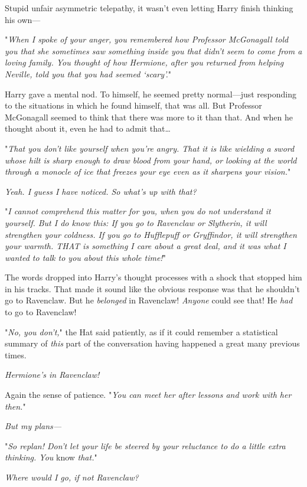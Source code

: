 Stupid unfair asymmetric telepathy, it wasn't even letting Harry finish
thinking his own---

"\emph{When I spoke of your anger, you remembered how Professor McGonagall told
you that she sometimes saw something inside you that didn't seem to come from a
loving family. You thought of how Hermione, after you returned from helping
Neville, told you that you had seemed `scary'.}"

Harry gave a mental nod. To himself, he seemed pretty normal---just responding
to the situations in which he found himself, that was all. But Professor
McGonagall seemed to think that there was more to it than that. And when he
thought about it, even he had to admit that{\ldots}

"\emph{That you don't like yourself when you're angry. That it is like wielding
a sword whose hilt is sharp enough to draw blood from your hand, or looking at
the world through a monocle of ice that freezes your eye even as it sharpens
your vision.}"

\emph{Yeah. I guess I have noticed. So what's up with that?}

"\emph{I cannot comprehend this matter for you, when you do not understand it
yourself. But I do know this: If you go to Ravenclaw or Slytherin, it will
strengthen your coldness. If you go to Hufflepuff or Gryffindor, it will
strengthen your warmth. THAT is something I care about a great deal, and it was
what I wanted to talk to you about this whole time!}"

The words dropped into Harry's thought processes with a shock that stopped him
in his tracks. That made it sound like the obvious response was that he
shouldn't go to Ravenclaw. But he \emph{belonged} in Ravenclaw! \emph{Anyone}
could see that! He \emph{had} to go to Ravenclaw!

"\emph{No, you don't,}" the Hat said patiently, as if it could remember a
statistical summary of \emph{this} part of the conversation having happened a
great many previous times.

\emph{Hermione's in Ravenclaw!}

Again the sense of patience. "\emph{You can meet her after lessons and work
with her then.}"

\emph{But my plans---}

"\emph{So replan! Don't let your life be steered by your reluctance to do a
little extra thinking. You} know \emph{that.}"

\emph{Where would I go, if not Ravenclaw?}

